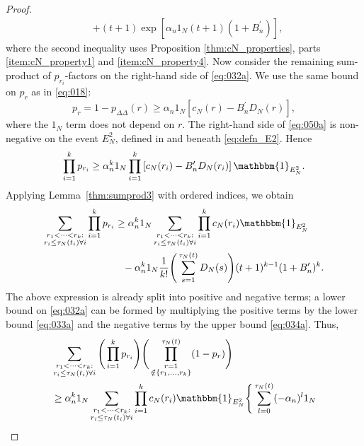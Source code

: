 \documentclass[12pt,authoryear]{article}
\theoremstyle{definition}
\newcommand{\1}[1]{\mathbbm{1}_{#1}}
\newcommand{\ON}{1_N}
\begin{document}
\begin{proof}
\begin{align}
    & + (t+1) \exp[ \alpha_n \ON (t+1) (1+B_n^\prime) ],
        \label{eq:034a}
\end{align}
where the second inequality uses Proposition \ref{thm:cN_properties}, parts \ref{item:cN_property1} and \ref{item:cN_property4}.
Now consider the remaining sum-product of $p_{r_i}$-factors on the right-hand side of \eqref{eq:032a}.
We use the same bound on $p_r$ as in \eqref{eq:018}:
\begin{equation}\label{eq:050a}
p_r
= 1 - p_{\Delta\Delta}(r) 
\geq \alpha_n \ON 
        \left[ c_N(r) - B_n^\prime D_N(r) \right], 
\end{equation}
where the $\ON$ term does not depend on $r$.
The right-hand side of \eqref{eq:050a} is non-negative on the event $E_N^2$, defined in and beneath \eqref{eq:defn_E2}.
Hence
\begin{equation*}
\prod_{i=1}^k p_{r_i}
\geq \alpha_n^k \ON 
        \prod_{i=1}^k \left[ c_N(r_i) - B_n^\prime D_N(r_i) \right] \1{E_N^2} .
\end{equation*}
Applying Lemma~\ref{thm:sumprod3} with ordered indices, we obtain
\begin{align*}
\sum_{\substack{r_1 <\dots< r_k :\\ r_i \leq \tau_N(t_i) \forall i}}
        \prod_{i=1}^k p_{r_i}
&\geq \alpha_n^k \ON
        \sum_{\substack{r_1 <\dots< r_k :\\ r_i \leq \tau_N(t_i) \forall i}}
        \prod_{i=1}^k c_N(r_i) \1{E_N^2} \\
    &\phantom{\geq}- \alpha_n^k \ON \frac{1}{k!} \Bigg( \sum_{s=1}^{\tau_N(t)} D_N(s) \Bigg)
        (t+1)^{k-1} (1+B_n^\prime)^k.
\end{align*}
The above expression is already split into positive and negative terms; a lower bound on \eqref{eq:032a} can be formed by multiplying the positive terms by the lower bound \eqref{eq:033a} and the negative terms by the upper bound \eqref{eq:034a}. 
Thus,
\begin{align*}
&\sum_{\substack{r_1 <\dots< r_k :\\ r_i \leq \tau_N(t_i) \forall i}}
        \Bigg( \prod_{i=1}^k p_{r_i} \Bigg)
        \Bigg( \prod_{\substack{r=1 \\ \notin \{r_1,\dots,r_k\} }}^{\tau_N(t)} 
        (1-p_r) \Bigg) \\
&\geq \alpha_n^k \ON
        \sum_{\substack{r_1 <\dots< r_k :\\ r_i \leq \tau_N(t_i) \forall i}}
        \prod_{i=1}^k c_N(r_i) \1{E_N^2} \Bigg\{
        \sum_{l=0}^{\tau_N(t)} (-\alpha_n)^l \ON 

\end{align*}
\end{proof}
\end{document}
